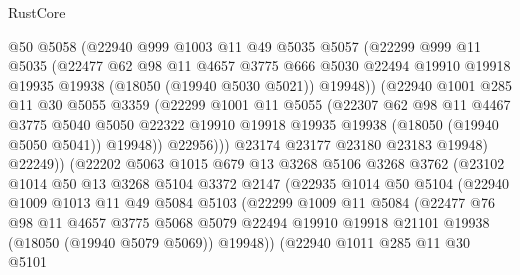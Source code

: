 \begin{lexlean}{RustCore}
\begin{coremodule}
              @50
              @5058
              (@22940
                @999
                @1003
                @11
                @49
                @5035
                @5057
                (@22299
                  @999
                  @11
                  @5035
                  (@22477
                    @62
                    @98
                    @11
                    @4657
                    @3775
                    @666
                    @5030
                    @22494
                    @19910
                    @19918
                    @19935
                    @19938
                    (@18050 (@19940 @5030 @5021))
                    @19948))
                (@22940
                  @1001
                  @285
                  @11
                  @30
                  @5055
                  @3359
                  (@22299
                    @1001
                    @11
                    @5055
                    (@22307
                      @62
                      @98
                      @11
                      @4467
                      @3775
                      @5040
                      @5050
                      @22322
                      @19910
                      @19918
                      @19935
                      @19938
                      (@18050 (@19940 @5050 @5041))
                      @19948))
                  @22956)))
            @23174
            @23177
            @23180
            @23183
            @19948)
          @22249))
      (@22202
        @5063
        @1015
        @679
        @13
        @3268
        @5106
        @3268
        @3762
        (@23102
          @1014
          @50
          @13
          @3268
          @5104
          @3372
          @2147
          (@22935
            @1014
            @50
            @5104
            (@22940
              @1009
              @1013
              @11
              @49
              @5084
              @5103
              (@22299
                @1009
                @11
                @5084
                (@22477
                  @76
                  @98
                  @11
                  @4657
                  @3775
                  @5068
                  @5079
                  @22494
                  @19910
                  @19918
                  @21101
                  @19938
                  (@18050 (@19940 @5079 @5069))
                  @19948))
              (@22940
                @1011
                @285
                @11
                @30
                @5101

\end{coremodule}
\end{lexlean}
